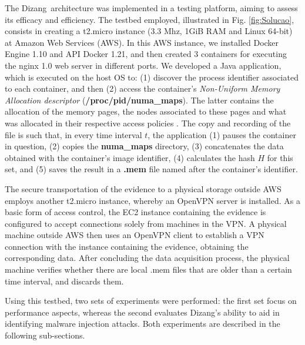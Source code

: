\documentclass[conference]{IEEEtran}
\newcommand{\marcos}[1]{{\color{green}{MARCOS: #1}}}
\newcommand{\fancyname}{Dizang}
\begin{document}
The \fancyname\ architecture was implemented in a testing platform, aiming to assess its efficacy and efficiency.
%
The testbed employed, illustrated in Fig. \ref{fig:Solucao}, consists in creating a t2.micro instance (3.3 Mhz, 1GiB RAM and Linux 64-bit) at Amazon Web Services (AWS).
%
In this AWS instance, we installed Docker Engine 1.10 and API Docker 1.21, and then created 3 containers for executing the nginx 1.0 web server in different ports. 
%
We developed a Java application, which is executed on the host OS to: 
(1) discover the process identifier associated to each container, and then 
(2) access the container's 
\textit{Non-Uniform Memory Allocation descriptor} (\textbf{/proc/pid/numa\_maps}).
%
The latter contains the allocation of the memory pages, the nodes associated to these pages and what was allocated in their respective access policies \cite{UnixManPages_numa_maps}.
%
The copy and recording of the file is such that, in every time interval $t$, the application (1) pauses the container in question, (2) copies the \textbf{numa\_maps} directory, (3) concatenates the data obtained with the container's image identifier, (4) calculates the hash $H$ for this set, and (5) saves the result in a \textbf{.mem} file named after the container's identifier.


The secure transportation of the evidence to a physical storage outside AWS employs another t2.micro instance, whereby an OpenVPN server is installed.
%
As a basic form of access control, the EC2 instance containing the evidence is configured to accept connections solely from machines in the VPN.
%
A physical machine outside AWS then uses an OpenVPN client to establish a VPN connection with the instance containing the evidence, obtaining the corresponding data.
%
After concluding the data acquisition process, the physical machine verifies whether there are local .mem files that are older than a certain time interval, and discards them.


Using this testbed, two sets of experiments were performed: the first set focus on performance aspects, whereas the second evaluates \fancyname's ability to aid in identifying malware injection attacks.
%
Both experiments are described in the following sub-sections.
\end{document}
